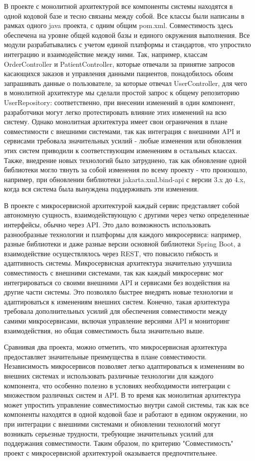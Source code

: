     В проекте с монолитной архитектурой все компоненты системы находятся в одной кодовой базе и тесно связаны между собой. Все классы были написаны в рамках одного java проекта, с одним общим pom.xml. Совместимость здесь обеспечена на уровне общей кодовой базы и единого окружения выполнения. Все модули разрабатывались с учетом единой платформы и стандартов, что упростило интеграцию и взаимодействие между ними. Так, например, классам OrderController и PatientController, которые отвечали за принятие запросов касающихся заказов и управления данными пациентов, понадобилось обоим запрашивать данные о пользователе, за которые отвечал UserController, для чего в монолитной архитектуре мы сделали простой запрос к общему репозиторию UserRepository: соответственно, при внесении изменений в один компонент, разработчики могут легко протестировать влияние этих изменений на всю систему. Однако монолитная архитектура имеет свои ограничения в плане совместимости с внешними системами, так как интеграция с внешними API и сервисами требовала значительных усилий - любые изменения или обновления этих систем приводили к соответствующим изменениям в остальных классах. Также, внедрение новых технологий было затруднено, так как обновление одной библиотеки могло тянуть за собой изменения по всему проекту - что произошло, например, при обновлении библиотеки jakarta.xml.bind-api с версии 3.x до 4.x, когда  вся система была вынуждена поддерживать эти изменения.
    
    В проекте с микросервисной архитектурой каждый сервис представляет собой автономную сущность, взаимодействующую с другими через четко определенные интерфейсы, обычно через API. Это дало возможность использовать разнообразные технологии и платформы для каждого микросервиса: например, разные библиотеки и даже разные версии основной библиотеки Spring Boot, а взаимодействие осуществлялось через REST, что повысило гибкость и адаптивность системы. Микросервисная архитектура значительно улучшила совместимость с внешними системами, так как каждый микросервис мог интегрироваться со своими внешними API и сервисами без воздействия на другие части системы. Это позволяло быстрее внедрять новые технологии и адаптироваться к изменениям внешних систем. Конечно, такая архитектура требовала дополнительных усилий для обеспечения совместимости между самими микросервисами, включая управление версиями API и мониторинг взаимодействия, но общая совместимость была значительно выше.

    Сравнивая два проекта, можно отметить, что микросервисная архитектура предоставляет значительные преимущества в плане совместимости. Независимость микросервисов позволяет легко адаптироваться к изменениям во внешних системах и использовать различные технологии для каждого компонента, что особенно полезно в условиях необходимости интеграции с множеством различных систем и API. В то время как монолитная архитектура может упростить управление совместимостью внутри самой системы, так как все компоненты находятся в одной кодовой базе и работают в едином окружении, но при интеграции с внешними системами и обновлении технологий могут возникать серьезные трудности, требующие значительных усилий для поддержания совместимости. Таким образом, по критерию "Совместимость" проект с микросервисной архитектурой оказывается предпочтительнее.


